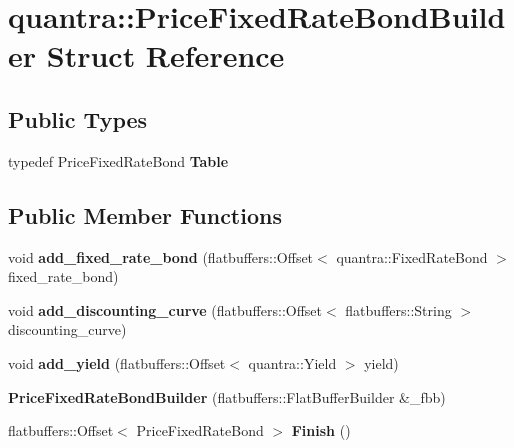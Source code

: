 \hypertarget{structquantra_1_1PriceFixedRateBondBuilder}{}\section{quantra\+:\+:Price\+Fixed\+Rate\+Bond\+Builder Struct Reference}
\label{structquantra_1_1PriceFixedRateBondBuilder}
\subsection*{Public Types}
\begin{DoxyCompactItemize}
\item 
\mbox{\label{structquantra_1_1PriceFixedRateBondBuilder_acbde14de8377ddb72126d5b57e403c0a}} 
typedef Price\+Fixed\+Rate\+Bond {\bfseries Table}
\end{DoxyCompactItemize}
\subsection*{Public Member Functions}
\begin{DoxyCompactItemize}
\item 
\mbox{\label{structquantra_1_1PriceFixedRateBondBuilder_aebf869a145d69dc2b8d367860735d664}} 
void {\bfseries add\+\_\+fixed\+\_\+rate\+\_\+bond} (flatbuffers\+::\+Offset$<$ quantra\+::\+Fixed\+Rate\+Bond $>$ fixed\+\_\+rate\+\_\+bond)
\item 
\mbox{\label{structquantra_1_1PriceFixedRateBondBuilder_af4ddd6198c4f0f3b77c04c376b21dfe7}} 
void {\bfseries add\+\_\+discounting\+\_\+curve} (flatbuffers\+::\+Offset$<$ flatbuffers\+::\+String $>$ discounting\+\_\+curve)
\item 
\mbox{\label{structquantra_1_1PriceFixedRateBondBuilder_a85119044f4f48476a3f6dc87f9bf95c4}} 
void {\bfseries add\+\_\+yield} (flatbuffers\+::\+Offset$<$ quantra\+::\+Yield $>$ yield)
\item 
\mbox{\label{structquantra_1_1PriceFixedRateBondBuilder_a47d43f1ec9926a3263633ea887eacf23}} 
{\bfseries Price\+Fixed\+Rate\+Bond\+Builder} (flatbuffers\+::\+Flat\+Buffer\+Builder \&\+\_\+fbb)
\item 
\mbox{\label{structquantra_1_1PriceFixedRateBondBuilder_a3cf0e43b064e52973e2d629a7b117e42}} 
flatbuffers\+::\+Offset$<$ Price\+Fixed\+Rate\+Bond $>$ {\bfseries Finish} ()
\end{DoxyCompactItemize}
